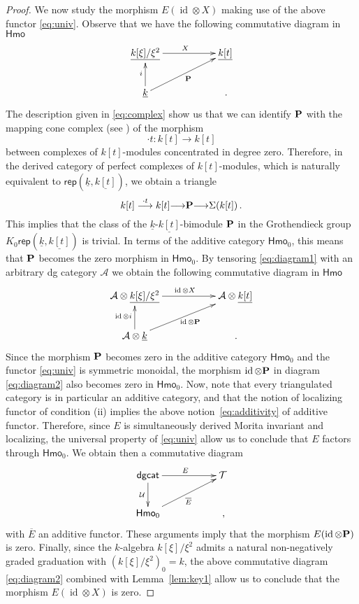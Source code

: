 \documentclass{amsart}
\numberwithin{equation}{subsection}
\theoremstyle{remark}
\theoremstyle{remark}
\theoremstyle{remark}
\theoremstyle{remark}
\begin{document}
\begin{proof}
We now study the morphism $E(\operatorname{id} \otimes X)$ making use of the above functor \eqref{eq:univ}. Observe that we have the following commutative diagram in ${\mathsf{Hmo}}$
\begin{equation}\label{eq:diagram1}
\xymatrix{
\underline{k[\xi]/\xi^2} \ar[rr]^X && \underline{k[t]} \\
\underline{k} \ar[u]^{i} \ar[urr]_{\bf P} && \,.
}
\end{equation}
The description given in \eqref{eq:complex} show us that we can identify ${\bf P}$ with the mapping cone complex (see \cite[\S1.5.1]{Weibel}) of the morphism
$$ \cdot t: k[t] {\longrightarrow} k[t]$$
between complexes of $k[t]$-modules concentrated in degree zero. Therefore, in the derived category of perfect complexes of $k[t]$-modules, which is naturally equivalent to ${\mathsf{rep}}(\underline{k},\underline{k[t]})$, we obtain a triangle
$$ k[t] \stackrel{\cdot t}{\longrightarrow} k[t] {\longrightarrow} {\bf P} {\longrightarrow} \Sigma (k[t])\,.$$
This implies that the class of the $\underline{k}\text{-}\underline{k[t]}$-bimodule ${\bf P}$ in the Grothendieck group $K_0 {\mathsf{rep}}(\underline{k}, \underline{k[t]})$ is trivial. In terms of the additive category ${\mathsf{Hmo}}_0$, this means that ${\bf P}$ becomes the zero morphism in ${\mathsf{Hmo}}_0$. By tensoring \eqref{eq:diagram1} with an arbitrary dg category ${{\mathcal A}}$ we obtain the following commutative diagram in ${\mathsf{Hmo}}$
\begin{equation}\label{eq:diagram2}
\xymatrix{
{{\mathcal A}}\otimes \underline{k[\xi]/\xi^2} \ar[rr]^{\operatorname{id} \otimes X} && {{\mathcal A}} \otimes \underline{k[t]} \\
{{\mathcal A}} \otimes \underline{k} \ar[u]^{\operatorname{id} \otimes i} \ar[urr]_{\operatorname{id} \otimes {\bf P}} && \,.
}
\end{equation}
Since the morphism ${\bf P}$ becomes zero in the additive category ${\mathsf{Hmo}}_0$ and the functor \eqref{eq:univ} is symmetric monoidal, the morphism $\operatorname{id} \otimes {\bf P}$ in diagram \eqref{eq:diagram2} also becomes zero in ${\mathsf{Hmo}}_0$. Now, note that every triangulated category is in particular an additive category, and that the notion of localizing functor of condition (ii) implies the above notion~\eqref{eq:additivity} of additive functor. Therefore, since $E$ is simultaneously derived Morita invariant and localizing, the universal property of \eqref{eq:univ} allow us to conclude that $E$ factors through ${\mathsf{Hmo}}_0$. We obtain then a commutative diagram
$$
\xymatrix{
{\mathsf{dgcat}}\ar[d]_{{\mathcal U}} \ar[rr]^E && {{\mathcal T}} \\
{\mathsf{Hmo}}_0 \ar[urr]_{\overline{E}} && \,,
}
$$
with $\overline{E}$ an additive functor. These arguments imply that the morphism $E(\operatorname{id} \otimes {\bf P})$ is zero. Finally, since the $k$-algebra $k[\xi]/\xi^2$ admits a natural non-negatively graded graduation with $(k[\xi]/\xi^2)_0=k$, the above commutative diagram \eqref{eq:diagram2} combined with Lemma~\ref{lem:key1} allow us to conclude that the morphism $E(\operatorname{id} \otimes X)$ is zero. 
\end{proof}
\end{document}

